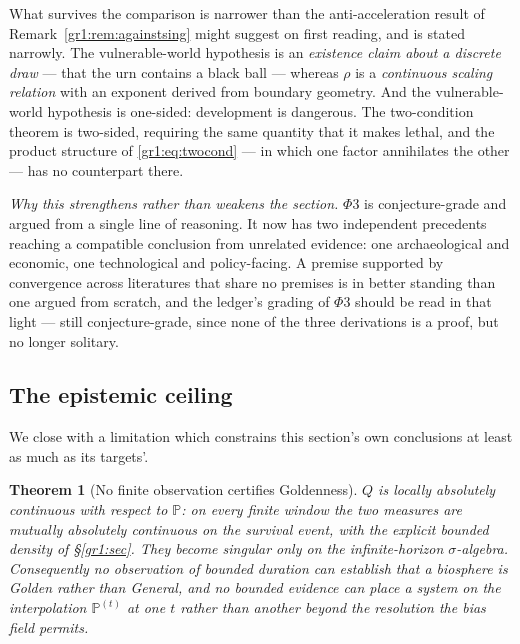 \documentclass[11pt]{article}
\numberwithin{equation}{section}
\theoremstyle{plain}
\newtheorem{theorem}{Theorem}[section]
\theoremstyle{definition}
\theoremstyle{remark}
\newcommand{\PP}{\mathbb{P}}
\begin{document}
What survives the comparison is narrower than the anti-acceleration
result of Remark~\ref{gr1:rem:againstsing} might suggest on first
reading, and is stated narrowly. The vulnerable-world hypothesis is an
\emph{existence claim about a discrete draw} --- that the urn contains a
black ball --- whereas $\rho$ is a \emph{continuous scaling relation}
with an exponent derived from boundary geometry. And the vulnerable-world
hypothesis is one-sided: development is dangerous. The two-condition
theorem is two-sided, requiring the same quantity that it makes lethal,
and the product structure of \eqref{gr1:eq:twocond} --- in which one
factor annihilates the other --- has no counterpart there.

\emph{Why this strengthens rather than weakens the section.} $\Phi3$ is
conjecture-grade and argued from a single line of reasoning. It now has
two independent precedents reaching a compatible conclusion from
unrelated evidence: one archaeological and economic, one
technological and policy-facing. A premise supported by convergence
across literatures that share no premises is in better standing than one
argued from scratch, and the ledger's grading of $\Phi3$ should be read
in that light --- still conjecture-grade, since none of the three
derivations is a proof, but no longer solitary.

\subsection{The epistemic ceiling}\label{gr:sub:ceiling}

We close with a limitation which constrains this section's own
conclusions at least as much as its targets'.

\begin{theorem}[No finite observation certifies Goldenness]
\label{gr:thm:ceiling}
$Q$ is locally absolutely continuous with respect to $\PP$: on every
finite window the two measures are mutually absolutely continuous on the
survival event, with the explicit bounded density of \S\ref{gr1:sec}. They
become singular only on the infinite-horizon $\sigma$-algebra.
Consequently no observation of bounded duration can establish that a
biosphere is Golden rather than General, and no bounded evidence can
place a system on the interpolation $\PP^{(t)}$ at one $t$ rather than
another beyond the resolution the bias field permits.
\end{theorem}
\end{document}
